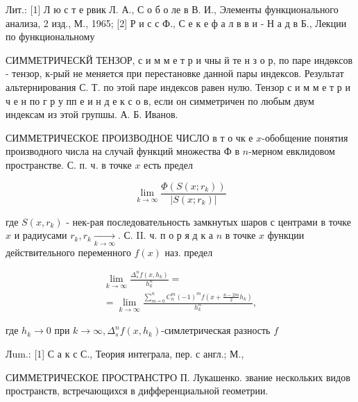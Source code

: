 \documentclass[10pt]{article}
\begin{document}
Лит.: [1] Л ю с т е рвик Л. А., С о б о ле в В. И., Элементы функционального анализа, 2 изд., М., 1965; [2] Р и с с Ф., С е к е ф а л в в и - Н а д в Б., Лекции по функциональному



СИММЕТРИЧЕСКЙ ТЕНЗОР, с и м м е т р и чны й те н з о р, по паре индөксов - тензор, к-рый не меняется при перестановке данной пары индексов. Результат альтернирования С. Т. по этой паре индексов равен нулю. Тензор с и м м е т р и ч е н по г р у пп е и н д е к с о в, если он симметричен по любым двум индексам из этой групшы. А. Б. Иванов.



СИММЕТРИЧЕСКОЕ ПРОИЗВОДНОЕ ЧИСЛО в т о чк е $x$-обобщение понятия производного числа на случай функций множества Ф в $n$-мерном евклидовом пространстве. С. п. ч. в точке $x$ есть предел



\[

\lim _{k \rightarrow \infty} \frac{\Phi\left(S\left(x ; r_{k}\right)\right)}{\left|S\left(x ; r_{k}\right)\right|}

\]



где $S\left(x, r_{k}\right)$ - нек-рая последовательность замкнутых шаров с центрами в точке $x$ и радиусами $r_{k}, r_{k} \underset{k \rightarrow \infty}{\longrightarrow}$. С. II. ч. п о р я д к а $n$ в точке $x$ функции действительного переменного $f(x)$ наз. предел



\[

\begin{gathered}

\lim _{k \rightarrow \infty} \frac{\Delta_{s}^{n} f\left(x, h_{k}\right)}{h_{k}^{n}}= \\

=\lim _{k \rightarrow \infty} \frac{\sum_{m=0}^{n} C_{n}^{m}(-1)^{m} f\left(x+\frac{n-2 m}{2} h_{k}\right)}{h_{k}^{n}},

\end{gathered}

\]



где $h_{k} \rightarrow 0$ при $k \rightarrow \infty, \Delta_{s}^{n} f\left(x, h_{k}\right)$-симлетрическая разность $f$



Лum.: [1] С а к с С., Теория интеграла, пер. с англ.; М.,



СИММЕТРИЧЕСКОЕ ПРОСТРАНСТРО П. Лукашенко. звание нескольких видов пространств, встречающихся в дифференциальной геометрии.
\end{document}
